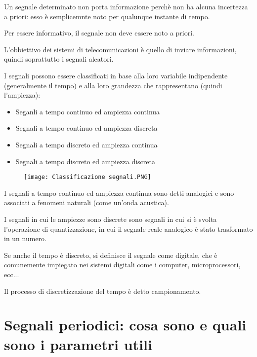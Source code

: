 Un segnale determinato non porta informazione perchè non ha alcuna incertezza a priori: \newline
esso è semplicemnte noto per qualunque instante di tempo. \newline 

Per essere informativo, il segnale non deve essere noto a priori. \newline 

L'obbiettivo dei sistemi di telecomunicazioni è quello di inviare informazioni, quindi soprattutto i segnali aleatori. \newline 

I segnali possono essere classificati in base alla loro variabile indipendente (generalmente il tempo) 
e alla loro grandezza che rappresentano (quindi l'ampiezza): 

\begin{itemize}
    \item Seganli a tempo continuo ed ampiezza continua 
    \item Segnali a tempo continuo ed ampiezza discreta 
    \item Segnali a tempo discreto ed ampiezza continua 
    \item Segnali a tempo discreto ed ampiezza discreta  
\end{itemize} 


\begin{figure}[h]
    \centering
    \texttt{[image: Classificazione segnali.PNG]}
\end{figure}  

I segnali a tempo continuo ed ampiezza continua sono detti analogici e sono associati a fenomeni naturali (come un'onda acustica). \newline 

I segnali in cui le ampiezze sono discrete sono segnali in cui si è svolta l'operazione di quantizzazione, 
in cui il segnale reale analogico è stato trasformato in un numero. \newline 

Se anche il tempo è discreto, si definisce il segnale come digitale, che è comunemente impiegato nei sistemi digitali come i computer, microprocessori, ecc... \newline

Il processo di discretizzazione del tempo è detto campionamento. \newline 

\newpage

\section{Segnali periodici: cosa sono e quali sono i parametri utili}

